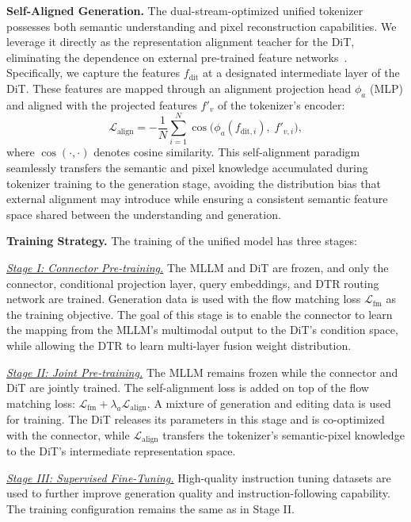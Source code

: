 \documentclass[runningheads]{llncs}
\begin{document}
\noindent\textbf{Self-Aligned Generation.}
The dual-stream-optimized unified tokenizer possesses both semantic understanding and pixel reconstruction capabilities. We leverage it directly as the representation alignment teacher for the DiT, eliminating the dependence on external pre-trained feature networks~\cite{oquab2023dinov2}. Specifically, we capture the features $f_{\text{dit}}$ at a designated intermediate layer of the DiT. These features are mapped through an alignment projection head $\phi_a$ (MLP) and aligned with the projected features $f'_v$ of the tokenizer's encoder:
$$\mathcal{L}_{\text{align}} = -\frac{1}{N}\sum_{i=1}^{N} \cos\big(\phi_a(f_{\text{dit},i}),\; f'_{v,i}\big),$$
where $\cos(\cdot, \cdot)$ denotes cosine similarity. This self-alignment paradigm seamlessly transfers the semantic and pixel knowledge accumulated during tokenizer training to the generation stage, avoiding the distribution bias that external alignment may introduce while ensuring a consistent semantic feature space shared between the understanding and generation.

\noindent\textbf{Training Strategy.} The training of the unified model has three stages:

\underline{\emph{Stage I: Connector Pre-training.}} The MLLM and DiT are frozen, and only the connector, conditional projection layer, query embeddings, and DTR routing network are trained. Generation data is used with the flow matching loss $\mathcal{L}_{\text{fm}}$ as the training objective. The goal of this stage is to enable the connector to learn the mapping from the MLLM's multimodal output to the DiT's condition space, while allowing the DTR to learn multi-layer fusion weight distribution.

\underline{\emph{Stage II: Joint Pre-training.}} The MLLM remains frozen while the connector and DiT are jointly trained. The self-alignment loss is added on top of the flow matching loss:
$\mathcal{L}_{\text{fm}} + \lambda_a \mathcal{L}_{\text{align}}.$
A mixture of generation and editing data is used for training. The DiT releases its parameters in this stage and is co-optimized with the connector, while $\mathcal{L}_{\text{align}}$ transfers the tokenizer's semantic-pixel knowledge to the DiT's intermediate representation space.

\underline{\emph{Stage III: Supervised Fine-Tuning.}} High-quality instruction tuning datasets are used to further improve generation quality and instruction-following capability. The training configuration remains the same as in Stage II.
\end{document}
